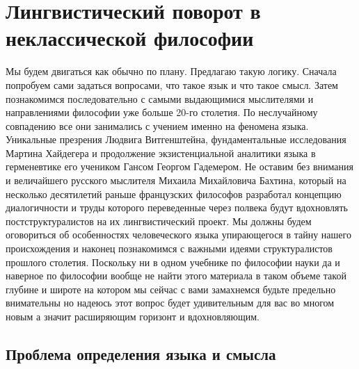\section{Лингвистический поворот в неклассической философии}

Мы будем двигаться как обычно по плану.
Предлагаю такую логику. Сначала попробуем сами задаться вопросами, что такое
язык и что такое смысл. Затем познакомимся последовательно с самыми выдающимися
мыслителями и направлениями философии уже больше 20-го столетия. По неслучайному
совпадению все они занимались с учением именно на феномена языка. Уникальные
презрения Людвига Витгенштейна, фундаментальные исследования Мартина Хайдегера и
продолжение экзистенциальной аналитики языка в герменевтике его учеником Гансом
Георгом Гадемером. Не оставим без внимания и величайшего русского мыслителя
Михаила Михайловича Бахтина, который на несколько десятилетий раньше французских
философов разработал концепцию диалогичности и труды которого переведенные через
полвека будут вдохновлять постструктуралистов на их лингвистический проект. Мы
должны будем оговориться об особенностях человеческого языка упирающегося в
тайну нашего происхождения и наконец познакомимся с важными идеями
структуралистов прошлого столетия. Поскольку ни в одном учебнике по философии
науки да и наверное по философии вообще не найти этого материала в таком объеме
такой глубине и широте на котором мы сейчас с вами замахнемся будьте предельно
внимательны но надеюсь этот вопрос будет удивительным для вас во многом новым а
значит расширяющим горизонт и вдохновляющим.

\subsection{Проблема определения языка и смысла}

